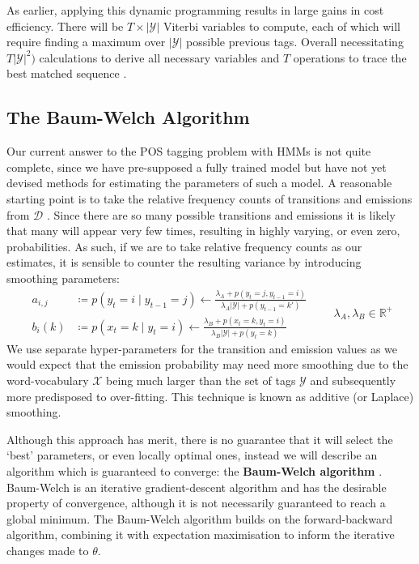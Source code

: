 \documentclass[../main.tex]{subfiles}
\begin{document}
As earlier, applying this dynamic programming results in large gains in cost efficiency. There will be $T \times |\mathcal{Y}|$ Viterbi variables to compute, each of which will require finding a maximum over $|\mathcal{Y}|$ possible previous tags. Overall necessitating $T|\mathcal{Y}|^2)$ calculations to derive all necessary variables and $T$ operations to trace the best matched sequence \autocite{eisenstein-nlp-2019}.

\subsection{The Baum-Welch Algorithm}

Our current answer to the POS tagging problem with HMMs is not quite complete, since we have pre-supposed a fully trained model but have not yet devised methods for estimating the parameters of such a model.
A reasonable starting point is to take the relative frequency counts of transitions and emissions from $\mathcal{D}$ \autocite{eisenstein-nlp-2019}.
Since there are so many possible transitions and emissions it is likely that many will appear very few times, resulting in highly varying, or even zero, probabilities.
As such, if we are to take relative frequency counts as our estimates, it is sensible to counter the resulting variance by introducing smoothing parameters:
\begin{equation} \label{eq:additive-smoothing}
\begin{aligned}
    a_{i,j} &\coloneqq p(y_t = i \mid y_{t-1} = j) \gets \frac{\lambda_A + p(y_t = j,  y_{t-1} = i)}{\lambda_A |\mathcal{Y}| + p(y_{t-1} = k')} \\
    b_i(k) &\coloneqq p(x_t = k \mid y_t = i) \gets \frac{\lambda_B + p(x_t = k ,  y_t = i)}{\lambda_B |\mathcal{Y}| + p(y_t = k)}
\end{aligned} \qquad \lambda_A, \lambda_B \in \mathbb{R}^+
\end{equation}
We use separate hyper-parameters for the transition and emission values as we would expect that the emission probability may need more smoothing due to the word-vocabulary $\mathcal{X}$ being much larger than the set of tags $\mathcal{Y}$ and subsequently more predisposed to over-fitting.
This technique is known as additive (or Laplace) smoothing.

Although this approach has merit, there is no guarantee that it will select the `best' parameters, or even locally optimal ones, instead we will describe an algorithm which is guaranteed to converge: the \textbf{Baum-Welch algorithm} \autocite{baum-1972-alg}.
Baum-Welch is an iterative gradient-descent algorithm and has the desirable property of convergence, although it is not necessarily guaranteed to reach a global minimum.
The Baum-Welch algorithm builds on the forward-backward algorithm, combining it with expectation maximisation to inform the iterative changes made to $\theta$.
\end{document}
